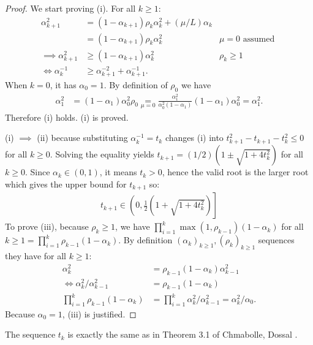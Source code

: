 \documentclass[12pt]{article}
\begin{document}
    \begin{proof}
        We start proving (i). 
        For all $k \ge 1$: 
        \begin{align*}
            \alpha_{k + 1}^2 
            &= (1 - \alpha_{k + 1})\rho_k\alpha_k^2 + (\mu/L) \alpha_k
            \\
            &= (1 - \alpha_{k + 1})\rho_k\alpha_k^2 & \mu = 0 \text{ assumed } 
            \\
            \implies 
            \alpha_{k + 1}^2 
            & \ge (1 - \alpha_{k + 1})\alpha_k^2 
            &  \rho_k \ge 1
            \\
            \iff 
            \alpha_k^{-1} 
            &\ge 
            \alpha_{k + 1}^{-2} + \alpha_{k + 1}^{-1}. 
        \end{align*}
        When $k = 0$, it has $\alpha_0 = 1$. 
        By definition of $\rho_0$ we have 
        \begin{align*}
            \alpha_1^2 &= 
            (1 - \alpha_1)\alpha_0^2\rho_0 \underset{\mu = 0}{=}
            \frac{\alpha_1^2}{\alpha_0^2(1 - \alpha_1)}(1 - \alpha_1)\alpha_0^2 = \alpha_1^2. 
        \end{align*}
        Therefore (i) holds. 
        (i) is proved. 
        \par
        (i) $\implies$ (ii) because substituting $\alpha_k^{-1} = t_k$ changes (i) into $t_{k + 1}^2 - t_{k + 1} - t_{k}^2 \le 0$ for all $k \ge 0$. 
        Solving the equality yields $t_{k + 1} = (1/2)\left(1 \pm \sqrt{1 + 4 t_k^2}\right)$ for all $k \ge 0$. 
        Since $\alpha_k \in (0, 1)$, it means $t_k > 0$, hence the valid root is the larger root which gives the upper bound for $t_{k + 1}$ so: 
        \begin{align*}
            t_{k + 1} \in \left(
                0, \frac{1}{2}\left(1 + \sqrt{1 + 4t_k^2}\right) 
            \right]
        \end{align*}
        To prove (iii), because $\rho_k \ge 1$, we have $\prod_{i = 1}^{k} \max(1, \rho_{k - 1})(1 - 
        \alpha_k)$ for all $k \ge 1 = \prod_{i = 1}^{k}\rho_{k - 1}(1 - \alpha_k)$. 
        By definition $(\alpha_k)_{k \ge 1}, (\rho_k)_{k \ge 1}$ sequences they have for all $k \ge 1$: 
        \begin{align*}
            \alpha_k^2 &= \rho_{k - 1}(1 - \alpha_k)\alpha_{k - 1}^2
            \\
            \iff 
            \alpha_k^2/\alpha_{k - 1}^2 &= \rho_{k - 1}(1 - \alpha_k)
            \\
            \prod_{i = 1}^{k}\rho_{k - 1}(1 - \alpha_k)
            &= 
            \prod_{i = 1}^{k}\alpha_k^2 /\alpha_{k - 1}^2= \alpha_k^2/\alpha_0. 
        \end{align*}
        Because $\alpha_0 = 1$, (iii) is justified. 
    \end{proof}
    \begin{remark}
        The sequence $t_k$ is exactly the same as in Theorem 3.1 of Chmabolle, Dossal \cite{chambolle_convergence_2015}. 
    \end{remark}
\end{document}
